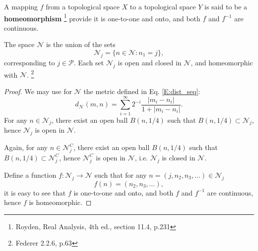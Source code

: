 \begin{definition}
A mapping $f$ from a topological space $X$ to a topological space $Y$ is
said to be a \textbf{homeomorphism}
	\footnote{Royden, Real Analysis, 4th ed., section 11.4, p.231}
provide it is one-to-one and onto, and both $f$ and $f^{-1}$ are continuous.
\end{definition}

\begin{lemma} 
The space $\mathcal{N}$ is the union of the sets
\begin{equation}
  \mathcal{N}_j = \{ n\in\mathcal{N}: n_1=j \},
\end{equation}
corresponding to $j\in\mathcal{P}$. Each set $\mathcal{N}_j$ is open and closed
in $\mathcal{N}$, and homeomorphic with $\mathcal{N}$.
\footnote{Federer 2.2.6, p.63}
\end{lemma}
\begin{proof}
We may use for $\mathcal{N}$ the metric defined in Eq. \ref{E:dist_seq}:
\[
	d_{\mathcal{N}}(m,n) 
	  = \sum_{i=1}^{\infty} 2^{-i} \frac{|m_i-n_i|}{1+|m_i-n_i|}.
\]
For any $n\in\mathcal{N}_j$, there exist an open ball $B(n,1/4)$ such that
$B(n,1/4)\subset\mathcal{N}_j$, hence $\mathcal{N}_j$ is open in $\mathcal{N}$.

Again, for any $n\in\mathcal{N}^C_j$, there exist an open ball $B(n,1/4)$ such that
$B(n,1/4)\subset\mathcal{N}^C_j$, hence $\mathcal{N}^C_j$ is open in
$\mathcal{N}$, i.e. $\mathcal{N}_j$ is closed in $\mathcal{N}$.

Define a function $f: \mathcal{N}_j \to \mathcal{N}$ such that for any 
$n=(j,n_2,n_3,\dots)\in\mathcal{N}_j$
\[
  f(n)=(n_2,n_3,\dots),
\]
it is easy to see that $f$ is one-to-one and onto, and both $f$ and 
$f^{-1}$ are continuous, hence $f$ is homeomorphic.
\end{proof}

